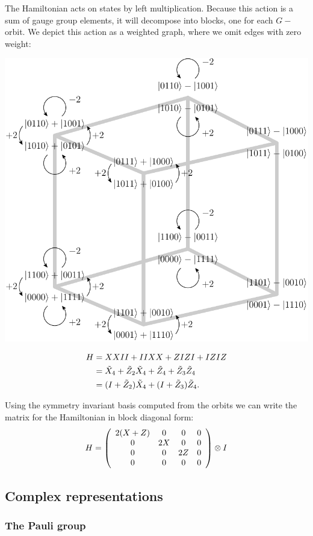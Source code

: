 \documentclass[12pt]{article}
\begin{document}
The Hamiltonian acts on states by left multiplication.
Because this action
is a sum of gauge group elements,
it will decompose into blocks,
one for each $G-$orbit.
We depict this action as a weighted graph, where we omit edges
with zero weight:
\begin{center}
\includegraphics[width=0.7\columnwidth]{pic-orbit.pdf}
\end{center}

\def\Xt{\tilde{X}}
\def\Zt{\tilde{Z}}

\begin{align*}
\Ham &= XXII + IIXX + ZIZI + IZIZ \\
  &= \Xt_4 + \Zt_2\Xt_4 + \Zt_4 + \Zt_3\Zt_4 \\
  &= (I+\Zt_2)\Xt_4 + (I+\Zt_3) \Zt_4.
\end{align*}

Using the symmetry invariant basis computed from the orbits we
can write the matrix for the Hamiltonian in
block diagonal form:
$$
H = 
\left( \begin{array}{cccc}
2(X+Z) & 0 & 0 & 0 \\
0  & 2X & 0 & 0 \\
0  & 0 & 2Z & 0 \\
0  & 0 & 0 & 0 \\
\end{array} \right) \otimes I
$$



\subsection{Complex representations}

\subsubsection{The Pauli group}
\end{document}
